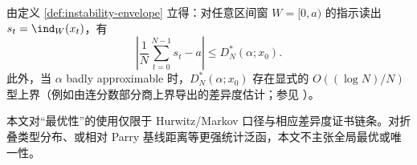 由定义 \ref{def:instability-envelope} 立得：对任意区间窗 $W=[0,a)$ 的指示读出 $s_t=\ind_W(x_t)$，有
\[
\left|\frac1N\sum_{t=0}^{N-1}s_t-a\right|\le D_N^*(\alpha;x_0).
\]
此外，当 $\alpha$ badly approximable 时，$D_N^*(\alpha;x_0)$ 存在显式的 $O((\log N)/N)$ 型上界（例如由连分数部分商上界导出的差异度估计；参见 \cite{KuipersNiederreiter1974}）。

\begin{remark}\label{rem:what-is-optimized}
本文对“最优性”的使用仅限于 Hurwitz/Markov 口径与相应差异度证书链条。对折叠类型分布、或相对 Parry 基线距离等更强统计泛函，本文不主张全局最优或唯一性。
\end{remark}
